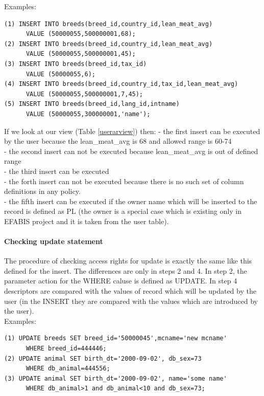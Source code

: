 Examples:
\begin{center}
\begin{verbatim}
(1) INSERT INTO breeds(breed_id,country_id,lean_meat_avg)
      VALUE (50000055,500000001,68);
(2) INSERT INTO breeds(breed_id,country_id,lean_meat_avg)
      VALUE (50000055,500000001,45);
(3) INSERT INTO breeds(breed_id,tax_id)
      VALUE (50000055,6);
(4) INSERT INTO breeds(breed_id,country_id,tax_id,lean_meat_avg)
      VALUE (50000055,500000001,7,45);
(5) INSERT INTO breeds(breed_id,lang_id,intname)
      VALUE (50000055,300000001,'name');
\end{verbatim}
\end{center}
If we look at our view (Table \ref{userarview}) then: 
- the first insert can be executed by the user because the lean\_meat\_avg is 68  and allowed range is 60-74\\
- the second insert can not be executed because lean\_meat\_avg is out of defined range \\
- the third insert can be executed \\
- the forth insert can not be executed because there is no such set of column definitions in any policy.\\
- the fifth insert can be executed if the owner name which will be inserted to the record is defined as PL (the owner is a special case     which is existing only in EFABIS project and it is taken from the user table).  

\paragraph{\textbf{Checking update statement}}

The procedure of checking access rights for update is exactly the same like this defined for the insert. The differences are only in steps 2 and 4. In step 2, the parameter action for the WHERE caluse is defined as UPDATE. In step 4 descriptors are compared with the values of record which will be updated by the user (in the INSERT they are compared with the values which are introduced by the user).\\

Examples:
\begin{center}
\begin{verbatim}
(1) UPDATE breeds SET breed_id='50000045',mcname='new mcname'
      WHERE breed_id=444446;
(2) UPDATE animal SET birth_dt='2000-09-02', db_sex=73
      WHERE db_animal=444556;
(3) UPDATE animal SET birth_dt='2000-09-02', name='some name' 
      WHERE db_animal>1 and db_animal<10 and db_sex=73;
\end{verbatim}
\end{center}

